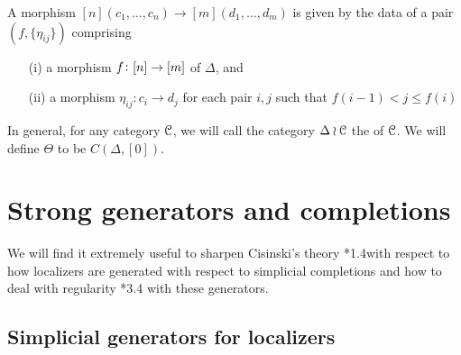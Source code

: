 A morphism \([n](c_1,\dots,c_n)\to
[m](d_1,\dots,d_m)\) is given by the data of a pair \((f, \{\eta_{ij}\})\) comprising
\begin{enumerate}
\item [(i)] a morphism \(f \colon [n]\rightarrow [m]\) of \(\Delta\), and
\item [(ii)] a morphism \(\eta_{ij}:c_i\to d_j\) for each pair \(i,j\) such that \(f(i-1)<j\leq f(i)\)
\end{enumerate}

In general, for any category \(\mathcal{C}\), we will call the category \(\Delta \wr \mathcal{C}\) the  of \(\mathcal{C}\).  
We will define \(\Theta\) to be \(C(\Delta,[0])\). 

\section{Strong generators and completions}

We will find it extremely useful to sharpen Cisinski's theory \cite{cisinski-book}*{1.4}with respect to how localizers are generated with respect to simplicial completions and how to deal with regularity \cite{cisinski-book}*{3.4} with these generators.

\subsection{Simplicial generators for localizers}


